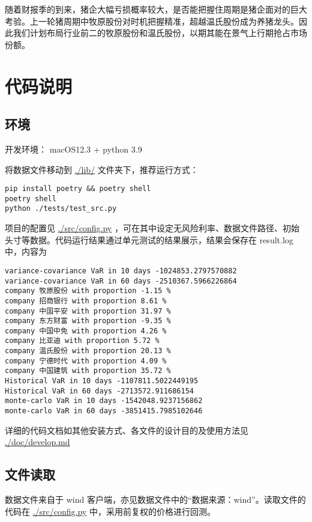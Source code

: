 \documentclass[a4paper,12pt]{ctexart}
\begin{document}
随着财报季的到来，猪企大幅亏损概率较大，是否能把握住周期是猪企面对的巨大考验。上一轮猪周期中牧原股份对时机把握精准，超越温氏股份成为养猪龙头。因此我们计划布局行业前二的牧原股份和温氏股份，以期其能在景气上行期抢占市场份额。
\section{代码说明}
\label{sec:org23c397c}
\subsection{环境}
\label{sec:orgd9fef59}

开发环境： macOS12.3 + python 3.9

将数据文件移动到 \url{./lib/} 文件夹下，推荐运行方式：
\begin{verbatim}
pip install poetry && poetry shell
poetry shell
python ./tests/test_src.py
\end{verbatim}
项目的配置见 \url{./src/config.py} ，可在其中设定无风险利率、数据文件路径、初始头寸等数据。代码运行结果通过单元测试的结果展示，结果会保存在 result.log 中，内容为

\begin{verbatim}
variance-covariance VaR in 10 days -1024853.2797570882
variance-covariance VaR in 60 days -2510367.5966226864
company 牧原股份 with proportion -1.15 %
company 招商银行 with proportion 8.61 %
company 中国平安 with proportion 31.97 %
company 东方财富 with proportion -9.35 %
company 中国中免 with proportion 4.26 %
company 比亚迪 with proportion 5.72 %
company 温氏股份 with proportion 20.13 %
company 宁德时代 with proportion 4.09 %
company 中国建筑 with proportion 35.72 %
Historical VaR in 10 days -1107811.5022449195
Historical VaR in 60 days -2713572.911686154
monte-carlo VaR in 10 days -1542048.9237156862
monte-carlo VaR in 60 days -3851415.7985102646
\end{verbatim}


详细的代码文档如其他安装方式、各文件的设计目的及使用方法见 \url{./doc/develop.md}

\subsection{文件读取}
\label{sec:org5f409df}
数据文件来自于 wind 客户端，亦见数据文件中的“数据来源：wind”。读取文件的代码在 \url{./src/config.py} 中，采用前复权的价格进行回测。
\end{document}
